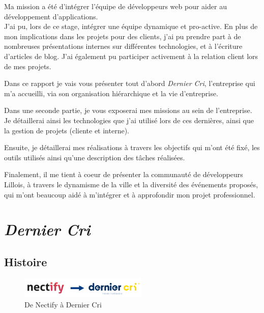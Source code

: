 \bigskip

Ma mission a été d'intégrer l'équipe de développeurs web pour aider au
développement d'applications.\\
J'ai pu, lors de ce stage, intégrer une équipe dynamique et pro-active.
En plus de mon implications dans les projets pour des clients, j'ai pu
prendre part à de nombreuses présentations internes sur différentes
technologies, et à l'écriture d'articles de blog. J'ai également pu
participer activement à la relation client lors de mes projets.

\bigskip

Dans ce rapport je vais vous présenter tout d'abord \emph{Dernier Cri},
l'entreprise qui m'a accueilli, via son organisation hiérarchique et la
vie d'entreprise.

\bigskip

Dans une seconde partie, je vous exposerai mes missions au sein de
l'entreprise. Je détaillerai ainsi les technologies que j'ai utilisé
lors de ces dernières, ainsi que la gestion de projets (cliente et
interne).

\bigskip

Ensuite, je détaillerai mes réalisations à travers les objectifs qui
m'ont été fixé, les outils utilisés ainsi qu'une description des tâches
réalisées.

\bigskip

Finalement, il me tient à coeur de présenter la communauté de
développeurs Lillois, à travers le dynamisme de la ville et la diversité
des événements proposés, qui m'ont beaucoup aidé à m'intégrer et à
approfondir mon projet professionnel.

\newpage

\section{\texorpdfstring{\emph{Dernier
Cri}}{Dernier Cri}}\label{dernier-cri}

\bigskip

\subsection{Histoire}\label{histoire}

\begin{figure}[h]
  \centering
  \includegraphics[height=1cm]{figures/NectifyToDC.png}
  \caption{De Nectify à Dernier Cri}
\end{figure}

